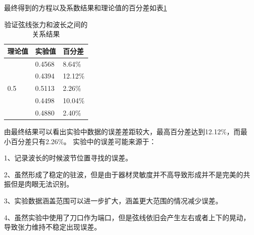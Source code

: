 \documentclass{ctexart}
\begin{document}
  最终得到的方程以及系数结果和理论值的百分差如表\ref{yanzhengzhanglibaifencha}
  \begin{table}[h]
    \centering   
    \caption{验证弦线张力和波长之间的关系结果}\label{yanzhengzhanglibaifencha}
    \begin{tabular}{| l || l || l |}
        \hline
        理论值 & 实验值 & 百分差\\
        \hline
        \multirow{5}{*}{0.5} & 0.4568 & 8.64\% \\
        \cline{2-3}
        & 0.4394 & 12.12\% \\
        \cline{2-3}
        & 0.5113 & 2.26\% \\
        \cline{2-3}
        & 0.4498 & 10.04\% \\
        \cline{2-3}
        & 0.4880 & 2.40\% \\
        \hline                   
    \end{tabular}
  \end{table}

  由最终结果可以看出实验中数据的误差差距较大，最高百分差达到12.12\%，而最小百分差只有2.26\%。
  实验中的误差可能来源于：

  1、记录波长的时候波节位置寻找的误差。

  2、虽然形成了稳定的驻波，但是由于器材灵敏度并不高导致形成并不是完美的共振但是肉眼无法识别。

  3、实验数据涵盖范围可以进一步扩大，涵盖更大范围的情况减少误差。

  4、虽然实验中使用了刀口作为端口，但是弦线依旧会产生左右或者上下的晃动，导致张力维持不稳定出现误差。
\end{document}
